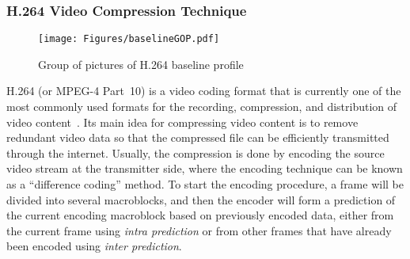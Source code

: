 \subsubsection{H.264 Video Compression Technique}
\label{sec::H264CompressionIntro}
%
\begin{figure}
\begin{center}
\texttt{[image: Figures/baselineGOP.pdf]}
\caption{\label{fig::baselineGOP}Group of pictures of H.264 baseline profile}
\end{center}
\end{figure}
%
H.264 (or MPEG-4 Part~10) is a video coding format that is currently one of the most commonly used formats for the recording, compression, and distribution of video content~\cite{H264Book}.
Its main idea for compressing video content is to remove redundant video data so that the compressed file can be efficiently transmitted through the internet.
Usually, the compression is done by encoding the source video stream at the transmitter side, where the encoding technique can be known as a ``difference coding'' method.
To start the encoding procedure, a frame will be divided into several macroblocks, and then the encoder will form a prediction of the current encoding macroblock based on previously encoded data, either from the current frame using \emph{intra prediction} or from other frames that have already been encoded using \emph{inter prediction}.

